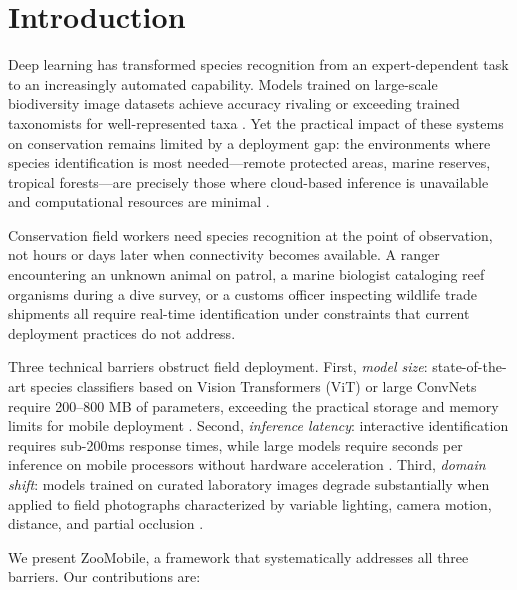 \section{Introduction}

\label{sec:introduction}

Deep learning has transformed species recognition from an expert-dependent task to an increasingly automated capability.
Models trained on large-scale biodiversity image datasets achieve accuracy rivaling or exceeding trained taxonomists for well-represented taxa \citep{vanhorn2021benchmarking}.
Yet the practical impact of these systems on conservation remains limited by a deployment gap: the environments where species identification is most needed---remote protected areas, marine reserves, tropical forests---are precisely those where cloud-based inference is unavailable and computational resources are minimal \citep{tuia2022perspectives}.

Conservation field workers need species recognition at the point of observation, not hours or days later when connectivity becomes available.
A ranger encountering an unknown animal on patrol, a marine biologist cataloging reef organisms during a dive survey, or a customs officer inspecting wildlife trade shipments all require real-time identification under constraints that current deployment practices do not address.

Three technical barriers obstruct field deployment.
First, \emph{model size}: state-of-the-art species classifiers based on Vision Transformers (ViT) or large ConvNets require 200--800 MB of parameters, exceeding the practical storage and memory limits for mobile deployment \citep{dosovitskiy2021image}.
Second, \emph{inference latency}: interactive identification requires sub-200ms response times, while large models require seconds per inference on mobile processors without hardware acceleration \citep{howard2019searching}.
Third, \emph{domain shift}: models trained on curated laboratory images degrade substantially when applied to field photographs characterized by variable lighting, camera motion, distance, and partial occlusion \citep{beery2018recognition}.

We present ZooMobile, a framework that systematically addresses all three barriers.
Our contributions are:


